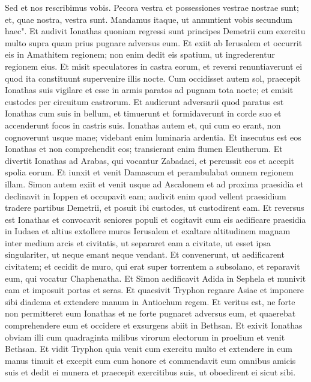 \begin{biblechapter}
\verse Sed et nos rescribimus vobis. Pecora vestra et possessiones vestrae nostrae sunt; et, quae nostra, vestra sunt. Mandamus itaque, ut annuntient vobis secundum haec". 
\verse Et audivit Ionathas quoniam regressi sunt principes Demetrii cum exercitu multo supra quam prius pugnare adversus eum. 
\verse Et exiit ab Ierusalem et occurrit eis in Amathitem regionem; non enim dedit eis spatium, ut ingrederentur regionem eius. 
\verse Et misit speculatores in castra eorum, et reversi renuntiaverunt ei quod ita constituunt supervenire illis nocte. 
\verse Cum occidisset autem sol, praecepit Ionathas suis vigilare et esse in armis paratos ad pugnam tota nocte; et emisit custodes per circuitum castrorum. 
\verse Et audierunt adversarii quod paratus est Ionathas cum suis in bellum, et timuerunt et formidaverunt in corde suo et accenderunt focos in castris suis. 
\verse Ionathas autem et, qui cum eo erant, non cognoverunt usque mane; videbant enim luminaria ardentia. 
\verse Et insecutus est eos Ionathas et non comprehendit eos; transierant enim flumen Eleutherum. 
\verse Et divertit Ionathas ad Arabas, qui vocantur Zabadaei, et percussit eos et accepit spolia eorum. 
\verse Et iunxit et venit Damascum et perambulabat omnem regionem illam. 
\verse Simon autem exiit et venit usque ad Ascalonem et ad proxima praesidia et declinavit in Ioppen et occupavit eam; 
\verse audivit enim quod vellent praesidium tradere partibus Demetrii, et posuit ibi custodes, ut custodirent eam. 
\verse Et reversus est Ionathas et convocavit seniores populi et cogitavit cum eis aedificare praesidia in Iudaea 
\verse et altius extollere muros Ierusalem et exaltare altitudinem magnam inter medium arcis et civitatis, ut separaret eam a civitate, ut esset ipsa singulariter, ut neque emant neque vendant. 
\verse Et convenerunt, ut aedificarent civitatem; et cecidit de muro, qui erat super torrentem a subsolano, et reparavit eum, qui vocatur Chaphenatha. 
\verse Et Simon aedificavit Adida in Sephela et munivit eam et imposuit portas et seras. 
\verse Et quaesivit Tryphon regnare Asiae et imponere sibi diadema et extendere manum in Antiochum regem. 
\verse Et veritus est, ne forte non permitteret eum Ionathas et ne forte pugnaret adversus eum, et quaerebat comprehendere eum et occidere et exsurgens abiit in Bethsan. 
\verse Et exivit Ionathas obviam illi cum quadraginta milibus virorum electorum in proelium et venit Bethsan. 
\verse Et vidit Tryphon quia venit cum exercitu multo et extendere in eum manus timuit  
\verse et excepit eum cum honore et commendavit eum omnibus amicis suis et dedit ei munera et praecepit exercitibus suis, ut oboedirent ei sicut sibi. 

\end{biblechapter}
